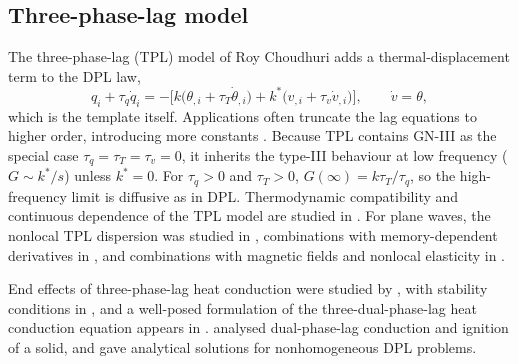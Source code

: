 \subsection{Three-phase-lag model}
The three-phase-lag (TPL) model of Roy Choudhuri \citep{RoyChoudhuri2007} adds a thermal-displacement term to the DPL law,
\begin{equation}
q_i+\tau_q\dot q_i=-\bigl[k\bigl(\theta_{,i}+\tau_T\dot\theta_{,i}\bigr)+k^*\bigl(v_{,i}+\tau_v\dot v_{,i}\bigr)\bigr],\qquad \dot v=\theta,\label{eq:tpl}
\end{equation}
which is the template itself. Applications often truncate the lag equations to higher order, introducing more constants \citep{Abouelregal2020,Abouelregal2020a}. Because TPL contains GN-III as the special case $\tau_q=\tau_T=\tau_v=0$, it inherits the type-III behaviour at low frequency ($G\sim k^*/s$) unless $k^*=0$. For $\tau_q>0$ and $\tau_T>0$, $G(\infty)=k\tau_T/\tau_q$, so the high-frequency limit is diffusive as in DPL. Thermodynamic compatibility and continuous dependence of the TPL model are studied in \citep{Chirita2016}. For plane waves, the nonlocal TPL dispersion was studied in \citep{Tiwari2021}, combinations with memory-dependent derivatives in \citep{Singh2019,Singh2020a,Biswas2019}, and combinations with magnetic fields and nonlocal elasticity in \citep{Bayones2021}.

End effects of three-phase-lag heat conduction were studied by \citep{Quintanilla2008}, with stability conditions in \citep{Quintanilla2008a}, and a well-posed formulation of the three-dual-phase-lag heat conduction equation appears in \citep{Quintanilla2009}. \citep{Antaki2000} analysed dual-phase-lag conduction and ignition of a solid, and \citep{Julius2017} gave analytical solutions for nonhomogeneous DPL problems.


